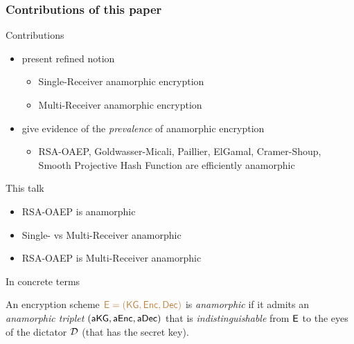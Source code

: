 \documentclass[]{beamer}
\begin{document}
\begin{frame}
\frametitle{Contributions of this paper}

\begin{block}{Contributions}
\begin{itemize}
\item present refined notion
    \begin{itemize}
        \item {\color{purple} Single-Receiver} anamorphic encryption
        \item {\color{purple} Multi-Receiver} anamorphic encryption
    \end{itemize}
\item give evidence of the {\em\color{purple} prevalence} of
anamorphic encryption
            \begin{itemize}
                \item RSA-OAEP, Goldwasser-Micali, Paillier, ElGamal, Cramer-Shoup, Smooth Projective Hash Function are efficiently anamorphic 
            \end{itemize}
\end{itemize}
\end{block}
\pause
\vfill
\begin{block}{This talk}

\begin{itemize}

\item RSA-OAEP is anamorphic
\item Single- vs Multi-Receiver anamorphic
\item RSA-OAEP is Multi-Receiver anamorphic
\end{itemize}

\end{block}
\end{frame}

\begin{frame}
\begin{block}{In concrete terms}

An encryption scheme $\color{brown}{\mathsf{E}}=({\mathsf{KG}},{\mathsf{Enc}},{\mathsf{Dec}})$ is {\color{red}\em anamorphic}
if it admits an {\color{blue}\em anamorphic triplet $({\mathsf{a}}{\mathsf{KG}},{\mathsf{a}}{\mathsf{Enc}},{\mathsf{a}}{\mathsf{Dec}})$}
that is 
{\color{blue}\em indistinguishable} from ${\mathsf{E}}$ to the eyes of
the {\color{red} dictator $\mathcal{D}$} (that has the secret key).

\end{block}
\end{frame}
\end{document}
